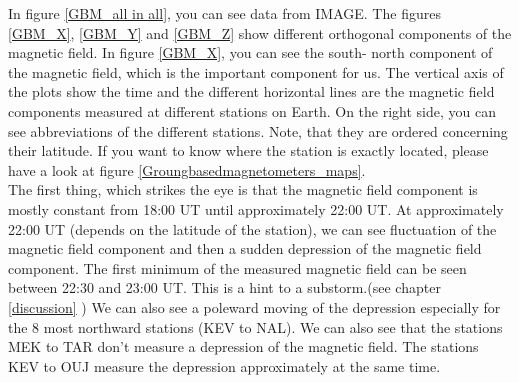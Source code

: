 \documentclass[10pt,a4paper]{article}
\begin{document}
In figure \ref{GBM_all in all}, you can see data from IMAGE. The figures \ref{GBM_X}, \ref{GBM_Y} and \ref{GBM_Z} show different orthogonal components of the magnetic field. In figure \ref{GBM_X}, you can see the south- north component of the magnetic field, which is the important component for us. The vertical axis of the plots show the time and the different horizontal lines are the magnetic field components measured at different stations on Earth. On the right side, you can see abbreviations of the different stations. Note, that they are ordered concerning their latitude. If you want to know where the station is exactly located, please have a look at figure \ref{Groungbasedmagnetometers_maps}.\\
The first thing, which strikes the eye is that the magnetic field component is mostly constant from 18:00 UT until approximately 22:00 UT. At approximately 22:00 UT (depends on the latitude of the station), we can see fluctuation of the magnetic field component and then a sudden depression of the magnetic field component. The first minimum of the measured magnetic field can be seen between 22:30 and 23:00 UT.
This is a hint to a substorm.(see chapter \ref{discussion} ) We can also see a poleward moving of the depression especially for the 8 most northward stations (KEV to NAL). We can also see that the stations MEK to TAR don't measure a depression of the magnetic field. The stations KEV to OUJ measure the depression approximately at the same time. 
\end{document}

